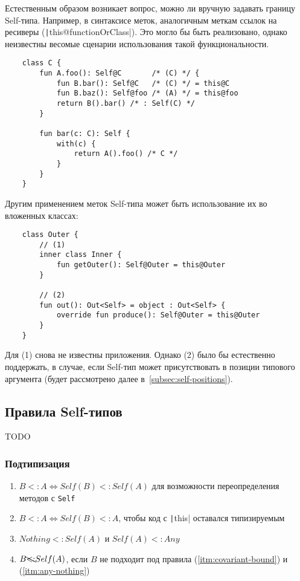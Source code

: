 Естественным образом возникает вопрос, можно ли вручную задавать границу Self-типа.
Например, в синтаксисе меток, аналогичным меткам ссылок на ресиверы (\texttt|this@functionOrClass|).
Это могло бы быть реализовано, однако неизвестны весомые сценарии использования такой функциональности.

\begin{verbatim}
    class C {
        fun A.foo(): Self@C       /* (C) */ {
            fun B.bar(): Self@C   /* (C) */ = this@C
            fun B.baz(): Self@foo /* (A) */ = this@foo
            return B().bar() /* : Self(C) */
        }

        fun bar(c: C): Self {
            with(c) {
                return A().foo() /* C */
            }
        }
    }
\end{verbatim}

Другим применением меток Self-типа может быть использование их во вложенных классах:

\begin{verbatim}
    class Outer {
        // (1)
        inner class Inner {
            fun getOuter(): Self@Outer = this@Outer
        }

        // (2)
        fun out(): Out<Self> = object : Out<Self> {
            override fun produce(): Self@Outer = this@Outer
        }
    }
\end{verbatim}

Для (1) снова не известны приложения.
Однако (2) было бы естественно поддержать, в случае, если Self-тип может присутствовать в позиции типового аргумента (будет рассмотрено далее в~\ref{subsec:self-positions}).


\subsection{Правила Self-типов}

TODO %

\subsubsection{Подтипизация}

\begin{enumerate}
    \item \label{itm:covariant-bound} $B <: A \iff Self(B) <: Self(A)$ для возможности переопределения методов с \texttt{Self}
    \item \label{itm:this-subtype} $B <: A \iff Self(B) <: A$, чтобы код с \texttt|this| оставался типизируемым
    \item \label{itm:any-nothing} $Nothing <: Self(A)$ и $Self(A) <: Any$
    \item \label{itm:no-subtypes} $B \bcancel{<:} Self(A)$, если $B$ не подходит под правила (\ref{itm:covariant-bound}) и (\ref{itm:any-nothing})
\end{enumerate}

